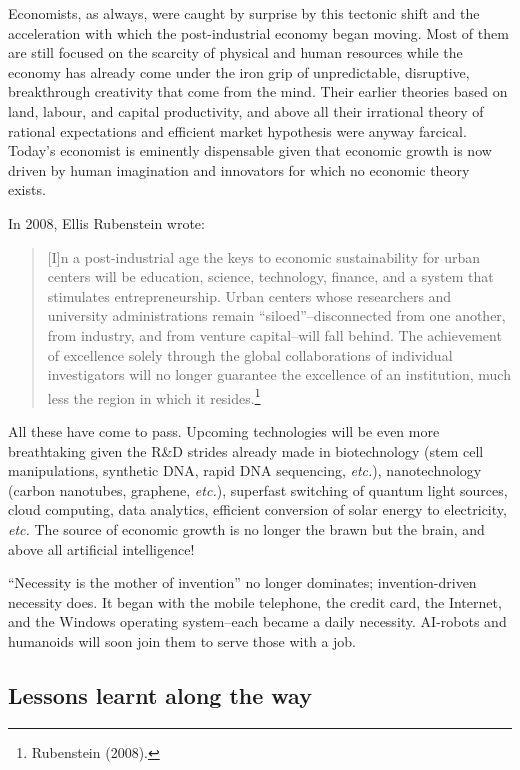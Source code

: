 \begin{multicols}{2}
Economists, as always, were caught by surprise by this tectonic shift and the acceleration with which the post-industrial economy began moving. Most of them are still focused on the scarcity of physical and human resources while the economy has already come under the iron grip of unpredictable, disruptive, breakthrough creativity that come from the mind. Their earlier theories based on land, labour, and capital productivity, and above all their irrational theory of rational expectations and efficient market hypothesis were anyway farcical. Today's economist is eminently dispensable given that economic growth is now driven by human imagination and innovators for which no economic theory exists.

In 2008, Ellis Rubenstein wrote:
\begin{quote}
[I]n a post-industrial age the keys to economic sustainability for urban centers will be education, science, technology, finance, and a system that stimulates entrepreneurship. Urban centers whose researchers and university administrations remain “siloed”--disconnected from one another, from industry, and from venture capital--will fall behind. The achievement of excellence solely through the global collaborations of individual investigators will no longer guarantee the excellence of an institution, much less the region in which it resides.\footnote{Rubenstein (2008).}
\end{quote}

All these have come to pass. Upcoming technologies will be even more breathtaking given the R\&D strides already made in biotechnology (stem cell manipulations, synthetic DNA, rapid DNA sequencing, \textit{etc.}), nanotechnology (carbon nanotubes, graphene, \textit{etc.}), superfast switching of quantum light sources, cloud computing, data analytics, efficient conversion of solar energy to electricity, \textit{etc.} The source of economic growth is no longer the brawn but the brain, and above all artificial intelligence! 

“Necessity is the mother of invention” no longer dominates; invention-driven necessity does. It began with the mobile telephone, the credit card, the Internet, and the Windows operating system--each became a daily necessity. AI-robots and humanoids will soon join them to serve those with a job. 

\subsection*{Lessons learnt along the way}


\end{multicols}
